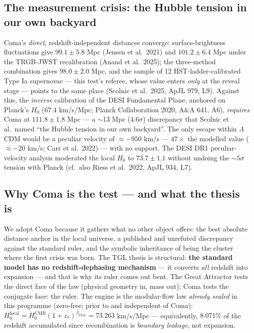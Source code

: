 \documentclass[11pt]{article}
\newcommand{\bTGL}{\beta_{\mathrm{TGL}}}\newcommand{\Msun}{M_{\odot}}\newcommand{\TGL}{\mathrm{TGL}}
\theoremstyle{definition}\newtheorem{deriv}{Derivation}
\begin{document}
\subsection*{The measurement crisis: the Hubble tension in our own backyard}

Coma's \emph{direct}, redshift-independent distances converge: surface-brightness fluctuations give $99.1\pm5.8$ Mpc (Jensen et al.\ 2021) and $101.2\pm6.4$ Mpc under the TRGB-JWST recalibration (Anand et al.\ 2025); the three-method combination gives $98.0\pm2.0$ Mpc, and the sample of 12 HST-ladder-calibrated Type Ia supernovae --- this test's referee, whose value enters \emph{only} at the reveal stage --- points to the same place (Scolnic et al.\ 2025, ApJL 979, L9). Against this, the \emph{inverse} calibration of the DESI Fundamental Plane, anchored on Planck's $H_0$ ($67.4$ km/s/Mpc; Planck Collaboration 2020, A\&A 641, A6), \emph{requires} Coma at $111.8\pm1.8$ Mpc --- a $\sim$13 Mpc ($4.6\sigma$) discrepancy that Scolnic et al.\ named ``the Hubble tension in our own backyard''. The only escape within $\Lambda$CDM would be a peculiar velocity of $\approx-950$ km/s --- $47\times$ the modelled value ($\approx-20$ km/s; Carr et al.\ 2022) --- with no support. The DESI DR1 peculiar-velocity analysis moderated the local $H_0$ to $73.7\pm1.1$ without undoing the $\sim5\sigma$ tension with Planck (cf.\ also Riess et al.\ 2022, ApJL 934, L7).

\subsection*{Why Coma is the test --- and what the thesis is}

We adopt Coma because it gathers what no other object offers: the best absolute distance anchor in the local universe, a published and unrefuted discrepancy against the standard ruler, and the symbolic inheritance of being the cluster where the first crisis was born. The TGL thesis is structural: \textbf{the standard model has no redshift-dephasing mechanism} --- it converts \emph{all} redshift into expansion --- and that is why its ruler comes out bent. The Great Attractor tests the direct face of the law (physical geometry in, mass out); Coma tests the conjugate face: the ruler. The engine is the modular-flow law \emph{already sealed} in this programme (zero-free; prior to and independent of Coma): $H_0^{\mathrm{local}}=H_0^{\mathrm{CMB}}(1+z_*)^{\bTGL}=73.263$ km/s/Mpc --- equivalently, $8.071\%$ of the redshift accumulated since recombination is \emph{boundary leakage}, not expansion.
\end{document}
